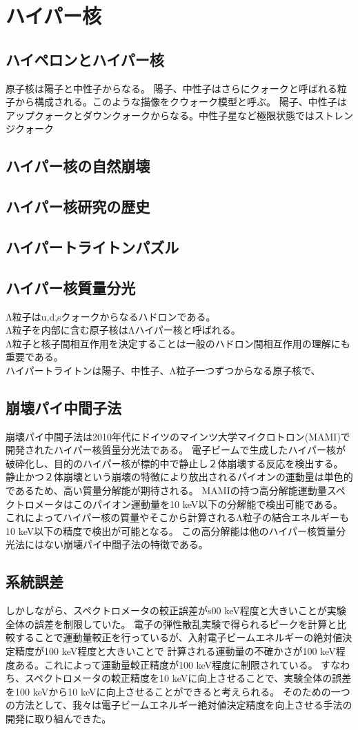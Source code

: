 \documentclass[a4paper,11pt,uplatex]{jsarticle}
\begin{document}
\section{ハイパー核}
\subsection{ハイペロンとハイパー核}
原子核は陽子と中性子からなる。
陽子、中性子はさらにクォークと呼ばれる粒子から構成される。このような描像をクウォーク模型と呼ぶ。
陽子、中性子はアップクォークとダウンクォークからなる。中性子星など極限状態ではストレンジクォーク
\subsection{ハイパー核の自然崩壊}
\subsection{ハイパー核研究の歴史}
\subsection{ハイパートライトンパズル}

\subsection{ハイパー核質量分光}
Λ粒子はu,d,sクォークからなるハドロンである。\\
Λ粒子を内部に含む原子核はΛハイパー核と呼ばれる。\\
Λ粒子と核子間相互作用を決定することは一般のハドロン間相互作用の理解にも重要である。\\
ハイパートライトンは陽子、中性子、Λ粒子一つずつからなる原子核で、
\subsection{崩壊パイ中間子法}
崩壊パイ中間子法は2010年代にドイツのマインツ大学マイクロトロン(MAMI)で開発されたハイパー核質量分光法である。
電子ビームで生成したハイパー核が破砕化し、目的のハイパー核が標的中で静止し２体崩壊する反応を検出する。
静止かつ２体崩壊という崩壊の特徴により放出されるパイオンの運動量は単色的であるため、高い質量分解能が期待される。
MAMIの持つ高分解能運動量スペクトロメータはこのパイオン運動量を10 keV以下の分解能で検出可能である。
これによってハイパー核の質量やそこから計算されるΛ粒子の結合エネルギーも10 keV以下の精度で検出が可能となる。
この高分解能は他のハイパー核質量分光法にはない崩壊パイ中間子法の特徴である。
\subsection{系統誤差}
しかしながら、スペクトロメータの較正誤差がs00 keV程度と大きいことが実験全体の誤差を制限していた。
電子の弾性散乱実験で得られるピークを計算と比較することで運動量較正を行っているが、入射電子ビームエネルギーの絶対値決定精度が100 keV程度と大きいことで
計算される運動量の不確かさが100 keV程度ある。これによって運動量較正精度が100 keV程度に制限されている。
すなわち、スペクトロメータの較正精度を10 keVに向上させることで、実験全体の誤差を100 keVから10 keVに向上させることができると考えられる。
そのための一つの方法として、我々は電子ビームエネルギー絶対値決定精度を向上させる手法の開発に取り組んできた。
\end{document}
